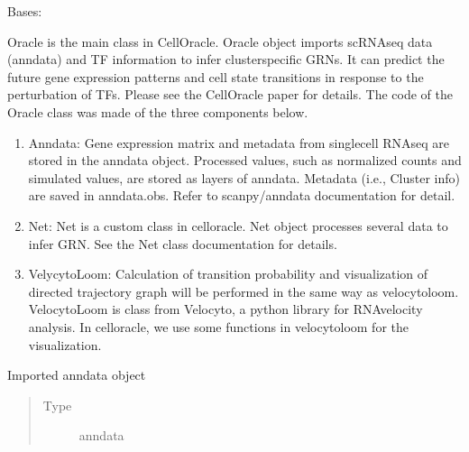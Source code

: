 \documentclass[letterpaper,10pt,english]{sphinxmanual}
\begin{document}
\begin{fulllineitems}
\label{\detokenize{modules/celloracle:celloracle.Oracle}}
Bases: 

Oracle is the main class in CellOracle. Oracle object imports scRNA\sphinxhyphen{}seq data (anndata) and TF information to infer cluster\sphinxhyphen{}specific GRNs. It can predict the future gene expression patterns and cell state transitions in response to  the perturbation of TFs. Please see the CellOracle paper for details.
The code of the Oracle class was made of the three components below.
\begin{enumerate}
%
\item {} 
Anndata: Gene expression matrix and metadata from single\sphinxhyphen{}cell RNA\sphinxhyphen{}seq are stored in the anndata object. Processed values, such as normalized counts and simulated values, are stored as layers of anndata. Metadata (i.e., Cluster info) are saved in anndata.obs. Refer to scanpy/anndata documentation for detail.

\item {} 
Net: Net is a custom class in celloracle. Net object processes several data to infer GRN. See the Net class documentation for details.

\item {} 
VelycytoLoom: Calculation of transition probability and visualization of directed trajectory graph will be performed in the same way as velocytoloom. VelocytoLoom is class from Velocyto, a python library for RNA\sphinxhyphen{}velocity analysis. In celloracle, we use some functions in velocytoloom for the visualization.

\end{enumerate}

\begin{fulllineitems}
\label{\detokenize{modules/celloracle:celloracle.Oracle.adata}}
Imported anndata object
\begin{quote}\begin{description}
\item[{Type}] \leavevmode
anndata


\end{description}
\end{quote}
\end{fulllineitems}
\end{fulllineitems}
\end{document}
